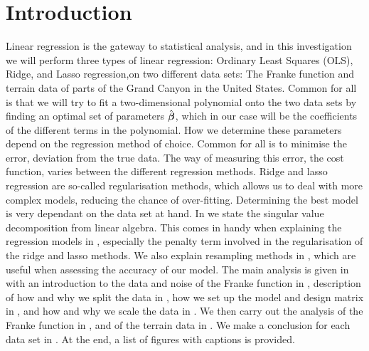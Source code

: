 \section{Introduction}\label{sec:intro}
Linear regression is the gateway to statistical analysis, and in this investigation we will perform three types of linear regression: Ordinary Least Squares (OLS), Ridge, and Lasso regression,on two different data sets: The Franke function and terrain data of parts of the Grand Canyon in the United States. Common for all is that we will try to fit a two-dimensional polynomial onto the two data sets by finding an optimal set of parameters $\hat{\boldsymbol{\beta}}$, which in our case will be the coefficients of the different terms in the polynomial. How we determine these parameters depend on the regression method of choice. Common for all is to minimise the error, deviation from the true data. The way of measuring this error, the cost function, varies between the different regression methods. Ridge and lasso regression are so-called regularisation methods, which allows us to deal with more complex models, reducing the chance of over-fitting. Determining the best model is very dependant on the data set at hand. In  we state the singular value decomposition from linear algebra. This comes in handy when explaining the regression models in , especially the penalty term involved in the regularisation of the ridge and lasso methods. We also explain resampling methods in , which are useful when assessing the accuracy of our model. The main analysis is given in  with an introduction to the data and noise of the Franke function in , description of how and why we split the data in , how we set up the model and design matrix in , and how and why we scale the data in . We then carry out the analysis of the Franke function in , and of the terrain data in . We make a conclusion for each data set in . At the end, a list of figures with captions is provided. 